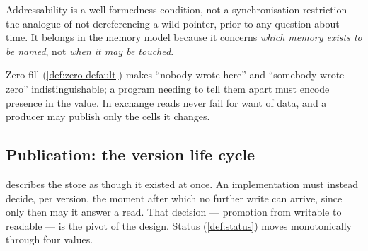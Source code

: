 Addressability is a well-formedness condition, not a synchronisation
restriction --- the analogue of not dereferencing a wild pointer, prior to any
question about time. It belongs in the memory model because it concerns
\emph{which memory exists to be named}, not \emph{when it may be touched}.

\begin{remark}
Zero-fill (\cref{def:zero-default}) makes ``nobody wrote here'' and ``somebody
wrote zero'' indistinguishable; a program needing to tell them apart must
encode presence in the value. In exchange reads never fail for want of data,
and a producer may publish only the cells it changes.
\end{remark}

\subsection{Publication: the version life cycle}
\label{sec:publication}

 describes the store as though it existed at once. An
implementation must instead decide, per version, the moment after which no
further write can arrive, since only then may it answer a read. That decision
--- promotion from writable to readable --- is the pivot of the design. Status
(\cref{def:status}) moves monotonically through four values.

